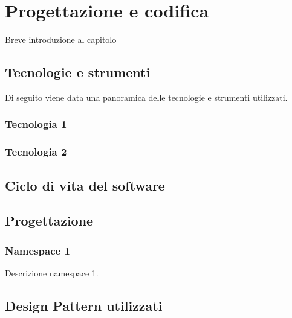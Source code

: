 \chapter{Progettazione e codifica}
\label{chap:progettazione-codifica}
Breve introduzione al capitolo

\section{Tecnologie e strumenti}
\label{sec:tecnologie-strumenti}
Di seguito viene data una panoramica delle tecnologie e strumenti utilizzati.

\subsection*{Tecnologia 1}


\subsection*{Tecnologia 2}

\section{Ciclo di vita del software}
\label{sec:ciclo-vita-software}

\section{Progettazione}
\label{sec:progettazione}

\subsection{Namespace 1}
Descrizione namespace 1.

\section{Design Pattern utilizzati}


\newpage